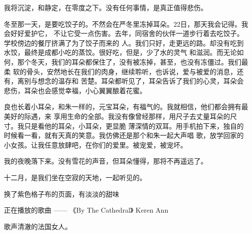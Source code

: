 \documentclass[12pt,a4paper]{article}
\begin{document}
		我将沉淀，和静定，在零度之下。没有任何事情，是真正值得悲伤。


		冬至那一天，是要吃饺子的。不然会在严冬里冻掉耳朵。22日，那天我会记得。我会好好爱护它，
	不让它受一点伤害。去年，同宿舍的伙伴一道步行着去吃饺子。学校傍边的餐厅挤满了为了饺子而来的
	人。我们只好，走更远的路。却没有吃到水饺，最终是成都小吃的蒸饺。很好吃，但是，少了水的灵气
	和滋润。而无论如何，那个冬天，我们的耳朵都保住了，没有被冻掉，甚至，也没有冻僵过。我们最柔
	软的骨头，安然地长在我们的肉身，继续聆听，也诉说，爱与被爱的消息，还有，离别与想念的温存和
	苦楚。耳朵都听见了，耳朵告诉了我们的心灵，耳朵会悲伤，耳朵也会感觉幸福，小心翼翼酿着花蜜。


		良也长着小耳朵，和朱一样的，元宝耳朵，有福气的。我就相信，他们都会拥有最美好的际遇，来
	享用生命的全部。我没有像曾经那样，用尺子去丈量耳朵的尺寸。我只是看他的耳朵，小耳朵，更显脆
	薄深情的双耳。用手机拍下来，独自的时候看一看，就有天真的笑意。我仿佛还是那个和朱一起大声唱
	歌，放学回家的小女孩。让我任意放肆吧，在你们的爱里。被宠爱，被宠坏。


		我的夜晚落下来。没有雪花的声音，但耳朵懂得，那将不再遥远了。

		十二月，是我们坐在空寂的天地，一起听见的。


		换了紫色格子布的页面，有淡淡的甜味

		正在播放的歌曲 —— 《By The Cathedral》 Keren Ann

		歌声清澈的法国女人。

\end{document}
